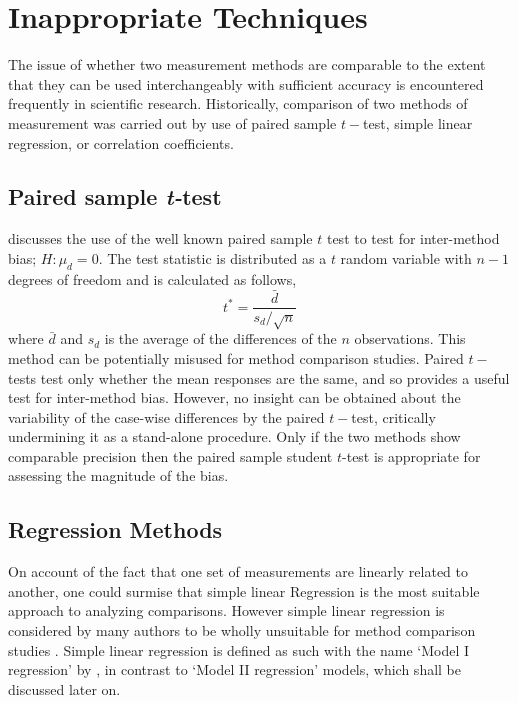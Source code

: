 \documentclass[12pt, a4paper]{report}
\theoremstyle{plain}
\theoremstyle{definition}
\theoremstyle{remark}
\begin{document}
	
	
	
	
	

\section{Inappropriate Techniques}
The issue of whether two measurement methods are comparable to the extent that they can be used interchangeably with sufficient accuracy is encountered frequently in scientific research. Historically, comparison of two methods of measurement was carried
out by use of paired sample $t-$test, 
simple linear regression, or correlation coefficients. 

	
	
	\subsection*{Paired sample \emph{t-}test}
	\citet{Bartko} discusses the use of the well known paired sample $t$ test to test for inter-method bias; $H: \mu_{d}=0$. The test
	statistic is distributed as a $t$ random variable with $n-1$ degrees of freedom and is calculated as follows,
	\begin{equation}
	t^{*} = \frac{\bar{d}}{ s_d/\sqrt{n}}
	\end{equation}
	where $\bar{d}$ and $s_{d}$ is the average of the differences of the $n$ observations. This method can be potentially misused for method comparison studies. Paired $t-$tests test only whether the mean responses are the same, and so provides a useful test for inter-method bias. However, no insight can be obtained about the variability of the case-wise differences by the paired $t-$test, critically undermining it as a stand-alone procedure. Only if the two methods show comparable
	precision then the paired sample student $t$-test is appropriate for assessing the magnitude of the bias.
	
	
	
	\subsection*{Regression Methods}
	On account of the fact that one set of measurements are linearly related to another, one could surmise that simple linear Regression is the most suitable approach to analyzing comparisons. However simple linear regression  is considered by many authors to be wholly unsuitable for method comparison studies \citep{BA83,CornCoch,ludbrook97}. Simple linear regression is defined as such with the name `Model I regression' by \citet{CornCoch}, in contrast to `Model II regression' models, which shall be discussed later on.
	
\end{document}
